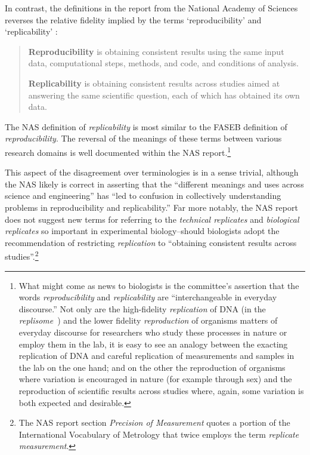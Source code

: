  In contrast, the definitions in the report from the National Academy of Sciences reverses the relative
	 fidelity implied by the terms `reproducibility' and `replicability' \cite[p.4]{committeeonreproducibilityandreplicabilityinscience2019reproducibility}: 
\begin{quote}
	\textbf{Reproducibility} is obtaining consistent results using the same input data, computational
	steps, methods, and code, and conditions of analysis.  \medskip

	\textbf{Replicability} is obtaining consistent results across studies aimed at answering the same
	scientific question, each of which has obtained its own data.
\end{quote}
      
The NAS definition of \emph{replicability} is most similar to the FASEB definition of \emph{reproducibility}.
The reversal of the meanings of these terms between various research domains is well documented within the NAS report.\footnote{
	What might come as news to biologists is the committee's assertion that the words \emph{reproducibility} and \emph{replicability} are 
		``interchangeable in everyday discourse.''
	Not only are the high-fidelity \emph{replication} of DNA (in the \emph{replisome}~\cite{spenkelink_recycling_2019}) and the lower fidelity \emph{reproduction}
		of organisms matters of everyday discourse for researchers who study these processes in nature or employ them in the lab,
		it is easy to see an analogy between the exacting replication of DNA and careful replication of measurements and samples
		in the lab on the one hand; and on the other the reproduction of organisms where variation is encouraged in nature
		(for example through sex) and the reproduction of scientific results across studies where, again, some variation is both 
		expected and desirable.}

This aspect of the disagreement over terminologies is in a sense trivial, although the NAS likely is correct in  
	asserting that the ``different meanings and uses across science and engineering'' has ``led to confusion in collectively 
	understanding problems in reproducibility and replicability.''
Far more notably, the NAS report does not suggest new terms for referring to the \emph{technical replicates} 
	and  \emph{biological replicates} so important in experimental biology--should biologists adopt the recommendation 
	of restricting \emph{replication} to ``obtaining consistent results across studies''.\footnote{
		The NAS report section \emph{Precision of Measurement} quotes a portion of the International Vocabulary of
		Metrology that twice employs the term \emph{replicate measurement}.
	}

